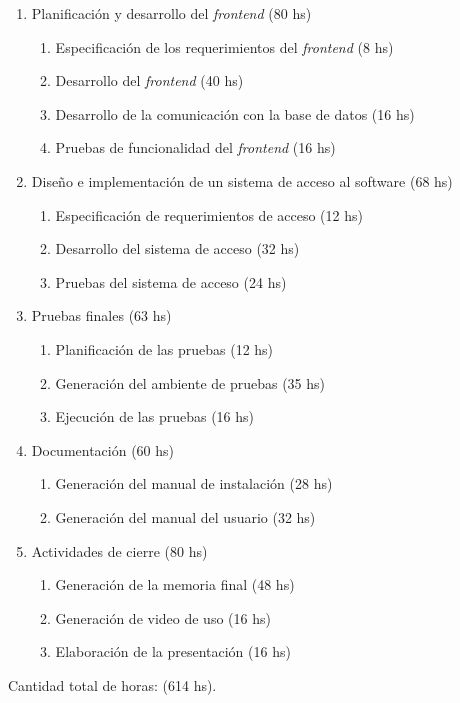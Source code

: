 \documentclass[
11pt, %
]{charter}
\begin{document}
\begin{enumerate}
\begin{enumerate}
	\end{enumerate}
\item Planificación y desarrollo del \textit{frontend} (80 hs)
	\begin{enumerate}
	\item Especificación de los requerimientos del \textit{frontend} (8 hs)
	\item Desarrollo del \textit{frontend} (40 hs)
	\item Desarrollo de la comunicación con la base de datos (16 hs)
	\item Pruebas de funcionalidad del \textit{frontend} (16 hs) 
	\end{enumerate}
\item Diseño e implementación de un sistema de acceso al software (68 hs)
	\begin{enumerate}
	\item Especificación de requerimientos de acceso (12 hs)
	\item Desarrollo del sistema de acceso (32 hs)
	\item Pruebas del sistema de acceso (24 hs) 
	\end{enumerate}		
\item Pruebas finales (63 hs)
	\begin{enumerate}
	\item Planificación de las pruebas (12 hs) 
	\item Generación del ambiente de pruebas (35 hs)
	\item Ejecución de las pruebas (16 hs)
	\end{enumerate}
\item Documentación (60 hs)
	\begin{enumerate}
	\item Generación del manual de instalación (28 hs)
	\item Generación del manual del usuario (32 hs)
	\end{enumerate}
\item Actividades de cierre (80 hs)
	\begin{enumerate}
	\item Generación de la memoria final (48 hs)
	\item Generación de video de uso (16 hs)
	\item Elaboración de la presentación (16 hs) 
	\end{enumerate}
\end{enumerate}

Cantidad total de horas: (614 hs).
\end{document}
